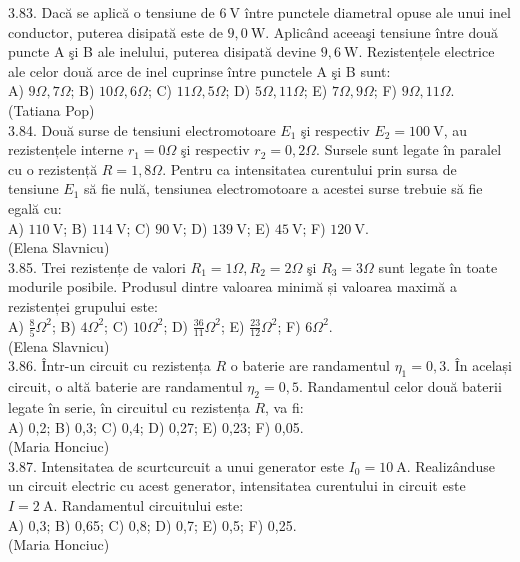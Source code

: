 3.83. Dacă se aplică o tensiune de $6 \mathrm{~V}$ între punctele diametral opuse ale unui inel conductor, puterea disipată este de $9,0 \mathrm{~W}$. Aplicând aceeaşi tensiune între două puncte A şi B ale inelului, puterea disipată devine $9,6 \mathrm{~W}$. Rezistențele electrice ale celor două arce de inel cuprinse între punctele A şi B sunt:\\ A) $9 \Omega , 7 \Omega$; B) $10 \Omega , 6 \Omega$; C) $11 \Omega , 5 \Omega$; D) $5 \Omega , 11 \Omega$; E) $7 \Omega , 9 \Omega$; F) $9 \Omega , 11 \Omega$.\\ (Tatiana Pop)\\

3.84. Două surse de tensiuni electromotoare $E_{1}$ şi respectiv $E_{2}=100 \mathrm{~V}$, au rezistențele interne $r_{1}=0 \Omega$ şi respectiv $r_{2}=0,2 \Omega$. Sursele sunt legate în paralel cu o rezistență $R=1,8 \Omega$. Pentru ca intensitatea curentului prin sursa de tensiune $E_{1}$ să fie nulă, tensiunea electromotoare a acestei surse trebuie să fie egală cu:\\ A) $110 \mathrm{~V}$; B) $114 \mathrm{~V}$; C) $90 \mathrm{~V}$; D) $139 \mathrm{~V}$; E) $45 \mathrm{~V}$; F) $120 \mathrm{~V}$.\\ (Elena Slavnicu)\\

3.85. Trei rezistențe de valori $R_{1}=1 \Omega, R_{2}=2 \Omega$ şi $R_{3}=3 \Omega$ sunt legate în toate modurile posibile. Produsul dintre valoarea minimă și valoarea maximă a rezistenței grupului este:\\ A) $\frac{8}{5} \Omega^{2}$; B) $4 \Omega^{2}$; C) $10 \Omega^{2}$; D) $\frac{36}{11} \Omega^{2}$; E) $\frac{23}{12} \Omega^{2}$; F) $6 \Omega^{2}$.\\ (Elena Slavnicu)\\

3.86. Într-un circuit cu rezistența $R$ o baterie are randamentul $\eta_{1}=0,3$. În același circuit, o altă baterie are randamentul $\eta_{2}=0,5$. Randamentul celor două baterii legate în serie, în circuitul cu rezistența $R$, va fi:\\ A) 0,2; B) 0,3; C) 0,4; D) 0,27; E) 0,23; F) 0,05.\\ (Maria Honciuc)\\

3.87. Intensitatea de scurtcurcuit a unui generator este $I_{0}=10 \mathrm{~A}$. Realizânduse un circuit electric cu acest generator, intensitatea curentului in circuit este $I=2 \mathrm{~A}$. Randamentul circuitului este:\\ A) 0,3; B) 0,65; C) 0,8; D) 0,7; E) 0,5; F) 0,25.\\ (Maria Honciuc)\\

